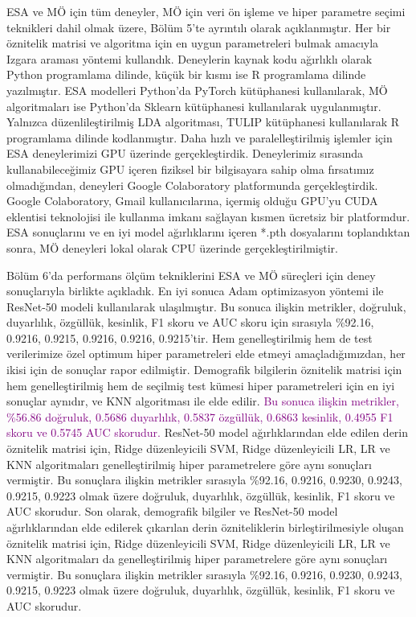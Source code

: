 ESA ve MÖ için tüm deneyler, MÖ için veri ön işleme ve hiper parametre seçimi teknikleri dahil olmak üzere, Bölüm 5'te ayrıntılı olarak açıklanmıştır. Her bir öznitelik matrisi ve algoritma için en uygun parametreleri bulmak amacıyla Izgara araması yöntemi kullandık. Deneylerin kaynak kodu ağırlıklı olarak Python programlama dilinde, küçük bir kısmı ise R programlama dilinde yazılmıştır. ESA modelleri Python'da PyTorch kütüphanesi kullanılarak, MÖ algoritmaları ise Python'da Sklearn kütüphanesi kullanılarak uygulanmıştır. Yalnızca düzenlileştirilmiş LDA algoritması, TULIP kütüphanesi kullanılarak R programlama dilinde kodlanmıştır. Daha hızlı ve paralelleştirilmiş işlemler için ESA deneylerimizi GPU üzerinde gerçekleştirdik. Deneylerimiz sırasında kullanabileceğimiz GPU içeren fiziksel bir bilgisayara sahip olma fırsatımız olmadığından, deneyleri Google Colaboratory platformunda gerçekleştirdik. Google Colaboratory, Gmail kullanıcılarına, içermiş olduğu GPU'yu CUDA eklentisi teknolojisi ile kullanma imkanı sağlayan kısmen ücretsiz bir platformdur. ESA sonuçlarını ve en iyi model ağırlıklarını içeren *.pth dosyalarını toplandıktan sonra, MÖ deneyleri lokal olarak CPU üzerinde gerçekleştirilmiştir.

Bölüm 6'da performans ölçüm tekniklerini ESA ve MÖ süreçleri için deney sonuçlarıyla birlikte açıkladık. En iyi sonuca Adam optimizasyon yöntemi ile ResNet-50 modeli kullanılarak ulaşılmıştır. Bu sonuca ilişkin metrikler, doğruluk, duyarlılık, özgüllük, kesinlik, F1 skoru ve AUC skoru için sırasıyla \%92.16, 0.9216, 0.9215, 0.9216, 0.9216, 0.9215'tir. Hem genelleştirilmiş hem de test verilerimize özel optimum hiper parametreleri elde etmeyi amaçladığımızdan, her ikisi için de sonuçlar rapor edilmiştir. Demografik bilgilerin öznitelik matrisi için hem genelleştirilmiş hem de seçilmiş test kümesi hiper parametreleri için en iyi sonuçlar aynıdır, ve KNN algoritması ile elde edilir. \textcolor{purple}{Bu sonuca ilişkin metrikler, \%56.86 doğruluk, 0.5686 duyarlılık, 0.5837 özgüllük, 0.6863 kesinlik, 0.4955 F1 skoru ve 0.5745 AUC skorudur.} ResNet-50 model ağırlıklarından elde edilen derin öznitelik matrisi için, Ridge düzenleyicili SVM, Ridge düzenleyicili LR, LR ve KNN algoritmaları genelleştirilmiş hiper parametrelere göre aynı sonuçları vermiştir. Bu sonuçlara ilişkin metrikler sırasıyla \%92.16, 0.9216, 0.9230, 0.9243, 0.9215, 0.9223 olmak üzere doğruluk, duyarlılık, özgüllük, kesinlik, F1 skoru ve AUC skorudur. Son olarak, demografik bilgiler ve ResNet-50 model ağırlıklarından elde edilerek çıkarılan derin özniteliklerin birleştirilmesiyle oluşan öznitelik matrisi için, Ridge düzenleyicili SVM, Ridge düzenleyicili LR, LR ve KNN algoritmaları da genelleştirilmiş hiper parametrelere göre aynı sonuçları vermiştir. Bu sonuçlara ilişkin metrikler sırasıyla \%92.16, 0.9216, 0.9230, 0.9243, 0.9215, 0.9223 olmak üzere doğruluk, duyarlılık, özgüllük, kesinlik, F1 skoru ve AUC skorudur.

